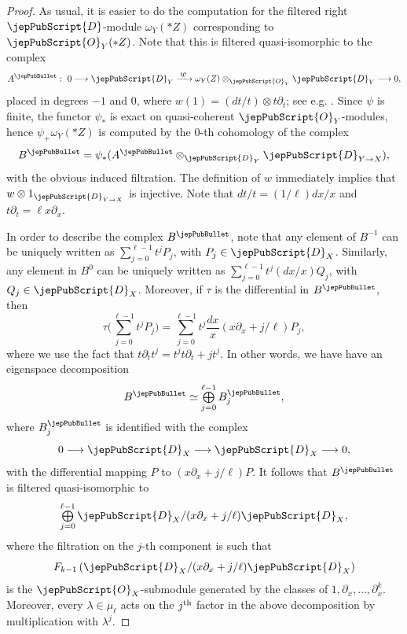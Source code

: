 \begin{proof}
As usual, it is easier to do the computation for the filtered right $\jepPubScript{D}$-module $\omega_Y(*Z)$ corresponding to $\jepPubScript{O}_Y(*Z)$. 
Note that this is filtered quasi-isomorphic to the complex
$$A^{\jepPubBullet}:\,\,0\longrightarrow \jepPubScript{D}_Y\xrightarrow{\;\textstyle w\;} \omega_Y(Z)\otimes_{\jepPubScript{O}_Y}\jepPubScript{D}_Y\longrightarrow 0,$$
placed in degrees $-1$ and $0$, where $w(1)=(dt/t)\otimes t\partial_t$; see e.g. \cite[Prop. 3.1]{MP1}. 
Since $\psi$ is finite, the functor $\psi_*$ is exact on quasi-coherent $\jepPubScript{O}_Y$-modules, hence
$\psi_+\omega_Y(*Z)$ is computed by the $0$-th cohomology of the complex
$$B^{\jepPubBullet}=\psi_*(A^{\jepPubBullet}\otimes_{\jepPubScript{D}_Y}\jepPubScript{D}_{Y\to X}),$$
with the obvious induced filtration. The definition of $w$
immediately implies that $w\otimes 1_{\jepPubScript{D}_{Y\to X}}$ is injective. 
Note that $dt/t=(1/\ell)dx/x$ and $t\partial_t=\ell x\partial_x$.

In order to describe the complex $B^{\jepPubBullet}$, note that any element of $B^{-1}$ can be uniquely written as $\sum_{j=0}^{\ell-1}t^jP_j$,
with $P_j\in \jepPubScript{D}_X$. Similarly, any element in $B^0$ can be uniquely written as $\sum_{j=0}^{\ell-1}t^j(dx/x)Q_j$, with $Q_j\in\jepPubScript{D}_X$.
Moreover, if $\tau$ is the differential in $B^{\jepPubBullet}$, then
$$\tau\bigg(\sum_{j=0}^{\ell-1}t^jP_j\bigg)=\sum_{j=0}^{\ell-1}t^j\frac{dx}{x}(x\partial_x+j/\ell)P_j,$$
where we use the fact that $t\partial_tt^j=t^jt\partial_t+jt^j$. In other words, we have have an eigenspace decomposition 
$$B^{\jepPubBullet}\simeq \mathop{\textstyle\bigoplus}\limits_{j=0}^{\ell-1}B^{\jepPubBullet}_j,$$
where $B^{\jepPubBullet}_j$ is identified with the complex
$$0\longrightarrow\jepPubScript{D}_X\longrightarrow \jepPubScript{D}_X\longrightarrow 0,$$
with the differential mapping $P$ to $(x\partial_x+j/\ell)P$.
It follows that $B^{\jepPubBullet}$ is filtered quasi-isomorphic to
$$\mathop{\textstyle\bigoplus}\limits_{j=0}^{\ell-1}\jepPubScript{D}_X/(x\partial_x+j/\ell)\jepPubScript{D}_X,$$
where the filtration on the $j$-th component is such that
$$F_{k-1}\left(\jepPubScript{D}_X/(x\partial_x+j/\ell)\jepPubScript{D}_X\right)$$
is the $\jepPubScript{O}_X$-submodule generated by the classes of $1,\partial_x,\ldots,\partial_x^k$.
Moreover, every $\lambda\in\mu_{\ell}$ acts on the $j^{\rm th}$ factor in the above decomposition
by multiplication with $\lambda^j$. 


\end{proof}
